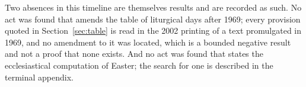 Two absences in this timeline are themselves results and are recorded as such. No act was found that
amends the table of liturgical days after 1969; every provision quoted in Section~\ref{sec:table} is read in the
2002 printing of a text promulgated in 1969, and no amendment to it was located, which is a bounded
negative result and not a proof that none exists. And no act was found that states the ecclesiastical
computation of Easter; the search for one is described in the terminal appendix.
